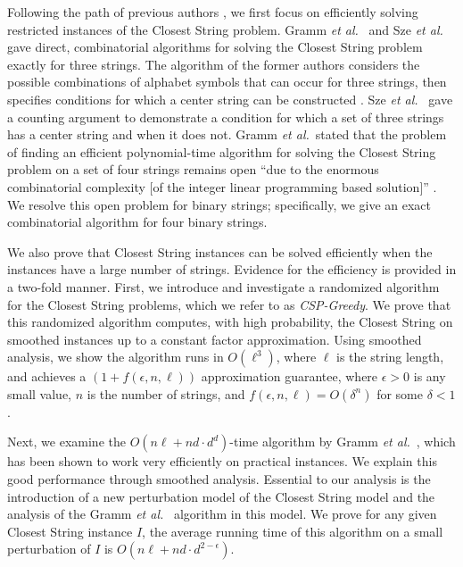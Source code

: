 Following the path of previous authors \cite{GNR01,SLC04}, we first focus on efficiently solving restricted instances of the {\sc Closest String} problem. Gramm {\em et al.}\ \cite{GNR01}  and Sze {\em et al.}\ \cite{SLC04}  gave direct, combinatorial algorithms for solving the {\sc Closest String} problem exactly for three strings.  The algorithm of the former authors considers the possible combinations of alphabet symbols that can occur for three strings, then specifies conditions for which a center string can be constructed \cite{GNR01}.  Sze {\em et al.}\ \cite{SLC04} gave a counting argument to demonstrate a condition for which a set of three strings has a center string and when it does not.  Gramm {\em et al.}\ stated that the problem of finding an efficient polynomial-time algorithm for solving the {\sc Closest String} problem on a set of four strings remains open ``due to the enormous combinatorial complexity [of the integer linear programming based solution]'' \cite[p. 13]{GNR03}.  We resolve this open problem for binary strings; specifically, we give an exact combinatorial algorithm for four binary strings.  

We also prove that {\sc Closest String} instances can be solved efficiently when the instances have a large number of strings.  Evidence for the efficiency is provided in a two-fold manner.  First, we introduce and investigate a randomized algorithm for the {\sc Closest String} problems, which we refer to as {\em CSP-Greedy}.  We prove that this randomized algorithm computes, with high probability, the {\sc Closest String} on smoothed instances up to a constant factor approximation.  Using smoothed analysis, we show the algorithm runs in $O(\ell^3)$, where $\ell$ is the string length, and achieves a $(1 + f(\epsilon, n, \ell))$ approximation guarantee, where $\epsilon > 0$ is any small value, $n$ is the number of strings, and $f(\epsilon, n, \ell) = O(\delta^n) $ for some $\delta < 1$.  

Next, we examine the $O(n\ell + nd \cdot d^d)$-time algorithm by Gramm {\em et al.}\ \cite{GNR03}, which has been shown to work very efficiently on practical instances. We explain this good performance through smoothed analysis.  Essential to our analysis is the introduction of a new perturbation model of the {\sc Closest String} model and the analysis of the Gramm {\em et al.}\ \cite{GNR03} algorithm in this model. We prove for any given {\sc Closest String} instance $I$, the average running time of this algorithm on a small perturbation of $I$ is $O(n\ell + nd \cdot d^{2 - \epsilon})$.  

